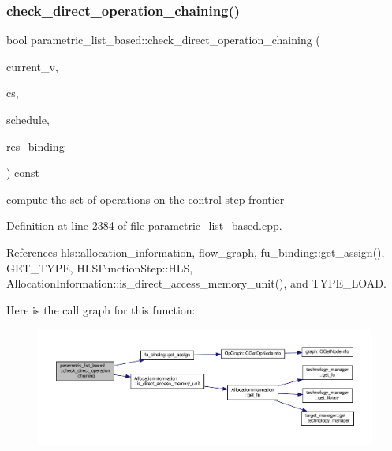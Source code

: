 \subsubsection{\texorpdfstring{check\+\_\+direct\+\_\+operation\+\_\+chaining()}{check\_direct\_operation\_chaining()}}
{\footnotesize\ttfamily bool parametric\+\_\+list\+\_\+based\+::check\+\_\+direct\+\_\+operation\+\_\+chaining (\begin{DoxyParamCaption}\item[{\hyperlink{graph_8hpp_abefdcf0544e601805af44eca032cca14}{vertex}}]{current\+\_\+v,  }\item[{const Control\+Step}]{cs,  }\item[{const \hyperlink{schedule_8hpp_a85e4dea8a1611026193d8ca13fc5a260}{Schedule\+Const\+Ref}}]{schedule,  }\item[{\hyperlink{fu__binding_8hpp_a619181df8ab98d7b7e17de58ac44b065}{fu\+\_\+binding\+Ref}}]{res\+\_\+binding }\end{DoxyParamCaption}) const\hspace{0.3cm}{\ttfamily [private]}}

compute the set of operations on the control step frontier 

Definition at line 2384 of file parametric\+\_\+list\+\_\+based.\+cpp.



References hls\+::allocation\+\_\+information, flow\+\_\+graph, fu\+\_\+binding\+::get\+\_\+assign(), G\+E\+T\+\_\+\+T\+Y\+PE, H\+L\+S\+Function\+Step\+::\+H\+LS, Allocation\+Information\+::is\+\_\+direct\+\_\+access\+\_\+memory\+\_\+unit(), and T\+Y\+P\+E\+\_\+\+L\+O\+AD.

Here is the call graph for this function\+:
\nopagebreak
\begin{figure}[H]
\begin{center}
\leavevmode
\includegraphics[width=350pt]{d7/d47/classparametric__list__based_a9fc96b3511360dc67e2cff71077a8d80_cgraph}
\end{center}
\end{figure}
\mbox{\label{classparametric__list__based_a582b8b501406c0dbd5245d1db2aa34a7}} 
